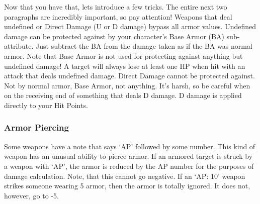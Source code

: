 \documentclass[twoside]{book}
\begin{document}
  
  

  

   Now that you have that, lets introduce a few tricks.
               The entire next two paragraphs are incredibly important,
               so pay attention!  Weapons that deal undefined or Direct Damage (U or D
               damage) bypass all armor values. Undefined damage can be
               protected against by your character's Base Armor
               (BA) sub-attribute. Just subtract the BA from the damage
               taken as if the BA was normal armor. Note that Base Armor
               is not used for protecting against anything but undefined
               damage! A target will always lose at least one HP when hit
               with an attack that deals undefined damage.  Direct Damage cannot be protected against. Not by
               normal armor, Base Armor, not anything. It's harsh,
               so be careful when on the receiving end of something that
               deals D damage. D damage is applied directly to your Hit
               Points. 
    

\subsubsection{Armor Piercing}
     Some weapons have a note that says
                 `AP' followed by some number. This kind of
                 weapon has an unusual ability to pierce armor. If an
                 armored target is struck by a weapon with
                 `AP', the armor is reduced by the AP number
                 for the purposes of damage calculation. Note, that this
                 cannot go negative. If an `AP: 10' weapon
                 strikes someone wearing 5 armor, then the armor is
                 totally ignored. It does not, however, go to -5. 
  
\end{document}
